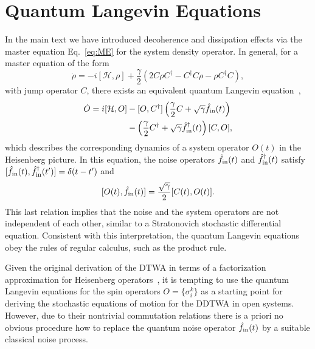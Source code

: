 \documentclass[pra,twocolumn,showpacs,preprintnumbers,amsmath,amssymb,superscriptaddress]{revtex4-1}
\begin{document}
\section{Quantum Langevin Equations}\label{app:QLE}
In the main text we have introduced decoherence and dissipation effects via the master equation Eq.~\eqref{eq:ME} for the system density operator. In general, for a master equation of the form
\begin{equation}
\dot \rho= -i[\mathcal{H},\rho] +\frac{\gamma}{2}\left(2C\rho C^\dag - C^\dag C \rho - \rho C^\dag C\right),
\end{equation}
with jump operator $C$, there exists an equivalent quantum Langevin equation~\cite{GardinerZoller},
\begin{equation}\label{eq:QLE}
\begin{split}
\dot O= i[\mathcal{H},O] &- [O,C^\dag] \left(\frac{\gamma}{2}C+\sqrt{\gamma} \hat f_{\rm in}(t)\right) \\
&- \left(\frac{\gamma}{2}C^\dag+\sqrt{\gamma} \hat f^\dag_{\rm in}(t)\right)[C,O],
\end{split}
\end{equation}
which describes the corresponding dynamics of a system operator $O(t)$ in the Heisenberg picture. In this equation, the noise operators $\hat f_{\rm in}(t)$ and $\hat f^\dag_{\rm in}(t)$ satisfy $[\hat f_{\rm in}(t),\hat f^\dag_{\rm in}(t')]=\delta (t-t')$ and~\cite{GardinerZoller} 
\begin{equation}\label{eq:NoiseCommutator}
[O(t),\hat f_{\rm in}(t) ]= \frac{\sqrt{\gamma}}{2} [ C(t),O(t)].
\end{equation}
This last relation implies that the noise and the system operators are not independent of each other, similar to a Stratonovich stochastic differential equation. Consistent with this interpretation, the quantum Langevin equations obey the rules of regular calculus, such as the product rule.

Given the original derivation of the DTWA in terms of a factorization approximation for Heisenberg operators~\cite{Schachenmayer2015}, it is tempting to use the quantum Langevin equations for the spin operators $O=\{\sigma_i^k\}$ as a starting point for deriving the stochastic equations of motion for the DDTWA in open systems. However, due to their nontrivial commutation relations there is a priori no obvious procedure how to replace the quantum noise operator $\hat f_{\rm in}(t)$ by a suitable classical noise process. 
\end{document}
